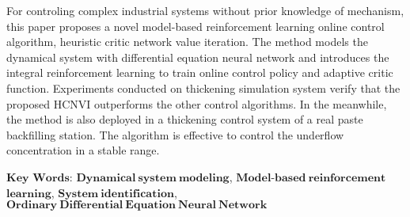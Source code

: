
For controling complex industrial systems without prior knowledge of mechanism, this paper proposes a novel
model-based reinforcement learning online control algorithm, heuristic critic network value iteration.
The method models the dynamical system with differential equation neural network and introduces the integral reinforcement learning to train online control policy and adaptive critic function.
Experiments conducted on thickening simulation system verify that the proposed HCNVI outperforms the other control algorithms.
In the meanwhile, the method is also deployed in a thickening control system of a real paste backfilling station.
The algorithm is effective to control the underflow concentration in a stable range.


\vskip 30bp
{
    $\mathbf{Key}$ $\mathbf{Words}$: 
    $\mathbf{Dynamical\ system\ modeling}$, 
    $\mathbf{Model}$-$\mathbf{based\ reinforcement}$
    $\mathbf{learning}$,
    $\mathbf{System\ identification}$, 
    $\mathbf{Ordinary\ Differential\ Equation\ Neural\ Network}$
    
}

